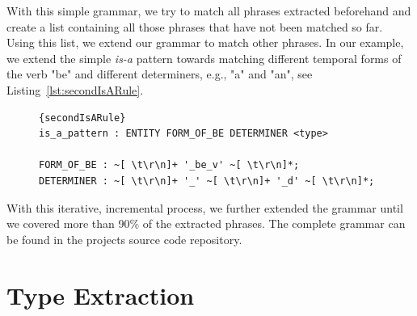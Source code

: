 With this simple grammar, we try to match all phrases extracted beforehand and create a list containing all those phrases that have not been matched so far.
Using this list, we extend our grammar to match other phrases.
In our example, we extend the simple \emph{is-a} pattern towards matching different temporal forms of the verb "be" and different determiners, e.g., "a" and "an", see Listing~\ref{lst:secondIsARule}.


\begin{figure}[htb!]
\begin{lstlisting}[label=lst:secondIsARule,caption=Extended version of the \emph{is-a} pattern.]{secondIsARule}
is_a_pattern : ENTITY FORM_OF_BE DETERMINER <type>

FORM_OF_BE : ~[ \t\r\n]+ '_be_v' ~[ \t\r\n]*;
DETERMINER : ~[ \t\r\n]+ '_' ~[ \t\r\n]+ '_d' ~[ \t\r\n]*;
\end{lstlisting}
\end{figure}

With this iterative, incremental process, we further extended the grammar until we covered more than 90\% of the extracted phrases.
The complete grammar can be found in the projects source code repository.



%
%
%
%

\section{Type Extraction}
\label{sec:docAnalysis}

